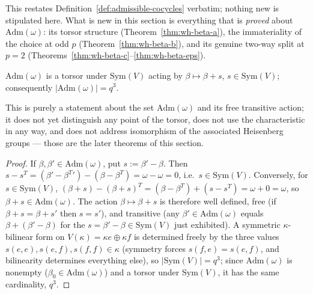 \begin{scope}
This restates Definition~\ref{def:admissible-cocycles} verbatim; nothing new
is stipulated here. What is new in this section is everything that is
\emph{proved} about $\mathrm{Adm}(\omega)$: its torsor structure
(Theorem~\ref{thm:wh-beta-a}), the immateriality of the choice at odd $p$
(Theorem~\ref{thm:wh-beta-b}), and its genuine two-way split at $p=2$
(Theorems~\ref{thm:wh-beta-c}--\ref{thm:wh-beta-eps}).
\end{scope}


\statusProved
\begin{theorem}
\label{thm:wh-beta-a}
$\mathrm{Adm}(\omega)$ is a torsor under $\mathrm{Sym}(V)$ acting by
$\beta \mapsto \beta+s$, $s\in\mathrm{Sym}(V)$; consequently
$|\mathrm{Adm}(\omega)| = q^3$.
\end{theorem}

\begin{scope}
This is purely a statement about the set $\mathrm{Adm}(\omega)$ and its free
transitive action; it does not yet distinguish any point of the torsor, does
not use the characteristic in any way, and does not address isomorphism of
the associated Heisenberg groups — those are the later theorems of this
section.
\end{scope}


\begin{proof}
If $\beta,\beta'\in\mathrm{Adm}(\omega)$, put $s:=\beta'-\beta$. Then
$s - s^T = (\beta'-\beta^T{}') - (\beta - \beta^T) = \omega - \omega = 0$,
i.e.\ $s\in\mathrm{Sym}(V)$. Conversely, for $s\in\mathrm{Sym}(V)$,
$(\beta+s)-(\beta+s)^T = (\beta-\beta^T)+(s-s^T) = \omega+0=\omega$, so
$\beta+s\in\mathrm{Adm}(\omega)$. The action $\beta\mapsto\beta+s$ is
therefore well defined, free (if $\beta+s=\beta+s'$ then $s=s'$), and
transitive (any $\beta'\in\mathrm{Adm}(\omega)$ equals $\beta+(\beta'-\beta)$
for the $s=\beta'-\beta\in\mathrm{Sym}(V)$ just exhibited). A symmetric
$\kappa$-bilinear form on $V(\kappa)=\kappa e\oplus\kappa f$ is determined
freely by the three values $s(e,e),s(e,f),s(f,f)\in\kappa$ (symmetry forces
$s(f,e)=s(e,f)$, and bilinearity determines everything else), so
$|\mathrm{Sym}(V)|=q^3$; since $\mathrm{Adm}(\omega)$ is nonempty
($\beta_0\in\mathrm{Adm}(\omega)$) and a torsor under $\mathrm{Sym}(V)$, it
has the same cardinality, $q^3$.
\end{proof}

